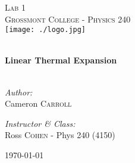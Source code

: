 \begin{titlepage}
\begin{center}

\textsc{\Large Lab 1}\\[1.5cm]
\textsc{\Large Grossmont College - Physics 240}\\[0.5cm]
\texttt{[image: ./logo.jpg]}

\HRule \\[0.4cm]
{ \LARGE \bfseries Linear Thermal Expansion}\\[0.5cm]

\HRule \\[1.5cm]

\begin{minipage}{0.4\textwidth}
\begin{flushleft} \large
\emph{Author:}\\
Cameron \textsc{Carroll}
\end{flushleft}
\end{minipage}
\begin{minipage}{0.4\textwidth}
\begin{flushright} \large
\emph{Instructor \& Class:}\\
Ross \textsc{Cohen} - Phys 240 (4150)
\end{flushright}
\end{minipage}

\vfill

{\large \today}

\end{center}
\end{titlepage}